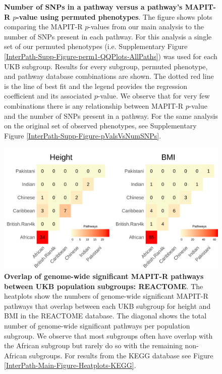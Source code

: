 \documentclass[12pt,a4paper]{article}
\begin{document}
\addtocounter{figure}{-1}
\begin{figure} [t!]
  \caption{\textbf{Number of SNPs in a pathway versus a pathway's MAPIT-R $p$-value using permuted phenotypes}. The figure shows plots comparing the MAPIT-R $p$-values from our main analysis to the number of SNPs present in each pathway. For this analysis a single set of our permuted phenotypes (i.e. Supplementary Figure \ref{InterPath-Supp-Figure-perm1-QQPlots-AllPaths}) was used for each UKB subgroup. Results for every subgroup, permuted phenotype, and pathway database combinations are shown. The dotted red line is the line of best fit and the legend provides the regression coefficient and its associated $p$-value. We observe that for very few combinations there is any relationship between MAPIT-R $p$-value and the number of SNPs present in a pathway. For the same analysis on the original set of observed phenotypes, see Supplementary Figure \ref{InterPath-Supp-Figure-pValsVsNumSNPs}.}
\label{InterPath-Supp-Figure-pValsVsNumSNPs-perm1-Caption}
\end{figure}
\clearpage


\setlength{\footskip}{1cm}
\begin{figure}[htbp]
\centering
\vspace*{-2cm}
\includegraphics[scale=.225]{Images/Supp/InterPath_Supp_Figure_Heatplots_REACTOME_vs3.png}
\caption[TBD]{\textbf{Overlap of genome-wide significant MAPIT-R pathways between UKB population subgroups: REACTOME}. The heatplots show the numbers of genome-wide significant MAPIT-R pathways that overlap between each UKB subgroup for height and BMI in the REACTOME database. The diagonal shows the total number of genome-wide significant pathways per population subgroup. We observe that most subgroups often have overlap with the African subgroup but rarely do so with the remaining non-African subgroups. For results from the KEGG database see Figure \ref{InterPath-Main-Figure-Heatplots-KEGG}.}
\label{InterPath-Supp-Figure-Heatplots-REACTOME}
\end{figure}
\clearpage
\setlength{\footskip}{1cm}
\end{document}
